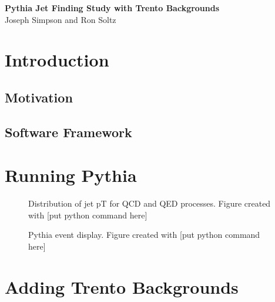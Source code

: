 \documentclass[11pt]{article}
\begin{document}
%
%
\newcommand{\zapspace}{\topsep=1pt\partopsep=1pt\itemsep=1pt\parskip=2pt}

\begin{center}
{\Large \bf Pythia Jet Finding Study with Trento Backgrounds\\}
Joseph Simpson and Ron Soltz
\end{center}

\begin{abstract}
%
%
\end{abstract}

\tableofcontents

\section{Introduction}
%
%

\subsection{Motivation}

\subsection{Software Framework}

\section{Running Pythia}
%
%

\begin{figure}[h]
\begin{center}
\label{fig_label}
\caption{Distribution of jet pT for QCD and QED processes.  Figure created with [put python command here]}
\end{center}
\end{figure}

\begin{figure}[h]
\begin{center}
\label{fig_label}
\caption{Pythia event display.  Figure created with [put python command here]}
\end{center}
\end{figure}

\section{Adding Trento Backgrounds}
%
%
\end{document}
